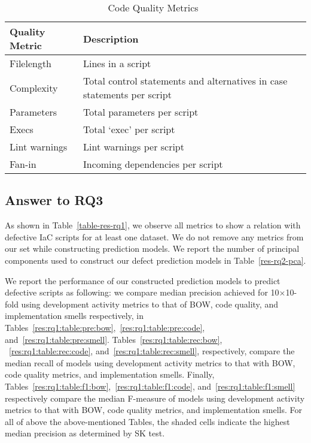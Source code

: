 \documentclass[smallextended]{svjour3}       %
\begin{document}
\begin{table}[]
\footnotesize
\captionsetup{justification=centering}
\caption{Code Quality Metrics~\citep{Bent:Saner2018:Puppet}}
\centering
\label{table:meth:pred:bent}
\begin{tabular}{p{3cm}p{8cm}}
\hline
\textbf{Quality Metric} & \textbf{Description}  \\
\hline
Filelength    &  Lines in a script \\
Complexity    & Total control statements and  alternatives  in
case statements per script  \\ 
Parameters    & Total parameters per script  \\
Execs         & Total `exec' per script  \\
Lint warnings & Lint warnings per script  \\
Fan-in        & Incoming  dependencies per script \\
\hline
\end{tabular}
\end{table} 



\subsection{Answer to RQ3} 
\label{res-rq3}

As shown in Table~\ref{table-res-rq1}, we observe all metrics to show a relation with defective IaC scripts for at least one dataset.  We do not remove any metrics from our set while constructing prediction models. We report the number of principal components used to construct our defect prediction models in Table~\ref{res-rq2-pca}. 

We report the performance of our constructed prediction models to predict defective scripts as following: we compare median precision achieved for 10$\times$10-fold using development activity metrics to that of BOW, code quality, and implementation smells respectively, in Tables~\ref{res:rq1:table:pre:bow},~\ref{res:rq1:table:pre:code}, and~\ref{res:rq1:table:pre:smell}. Tables~\ref{res:rq1:table:rec:bow}, ~\ref{res:rq1:table:rec:code}, and~\ref{res:rq1:table:rec:smell}, respectively, compare the median recall of models using development activity metrics to that with BOW, code quality metrics, and implementation smells. Finally, Tables~\ref{res:rq1:table:f1:bow},~\ref{res:rq1:table:f1:code}, and~\ref{res:rq1:table:f1:smell} respectively compare the median F-measure of models using development activity metrics to that with BOW, code quality metrics, and implementation smells. For all of above the above-mentioned Tables, the shaded cells indicate the highest median precision as determined by SK test.  
\end{document}
